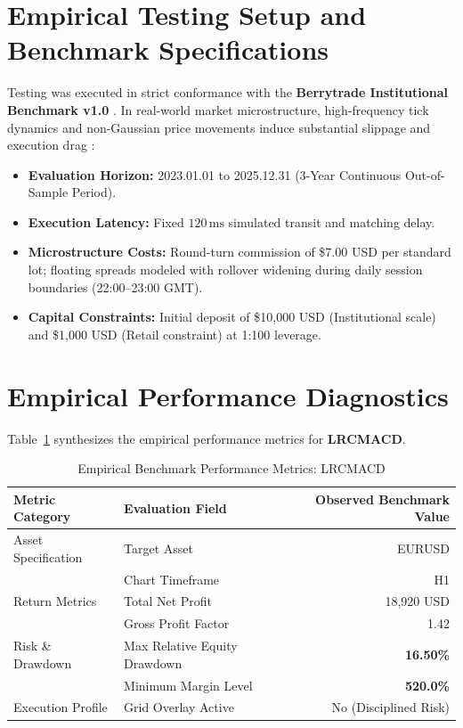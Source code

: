 \documentclass[11pt,a4paper]{article}
\begin{document}
\section{Empirical Testing Setup and Benchmark Specifications}
Testing was executed in strict conformance with the \textbf{Berrytrade Institutional Benchmark v1.0} \cite{artsu2026illusion}. In real-world market microstructure, high-frequency tick dynamics and non-Gaussian price movements induce substantial slippage and execution drag \cite{kyle1985continuous, amihud2002illiquidity, cont2001empirical, mandelbrot1963variation}:
\begin{itemize}
    \item \textbf{Evaluation Horizon:} 2023.01.01 to 2025.12.31 (3-Year Continuous Out-of-Sample Period).
    \item \textbf{Execution Latency:} Fixed $120\,\text{ms}$ simulated transit and matching delay.
    \item \textbf{Microstructure Costs:} Round-turn commission of \$7.00 USD per standard lot; floating spreads modeled with rollover widening during daily session boundaries (22:00--23:00 GMT).
    \item \textbf{Capital Constraints:} Initial deposit of \$10,000 USD (Institutional scale) and \$1,000 USD (Retail constraint) at 1:100 leverage.
\end{itemize}

\section{Empirical Performance Diagnostics}
Table~\ref{tab:metrics} synthesizes the empirical performance metrics for \textbf{LRCMACD}.

\begin{table}[H]
\centering
\caption{Empirical Benchmark Performance Metrics: LRCMACD}
\label{tab:metrics}
\begin{tabular}{llr}
\toprule
\textbf{Metric Category} & \textbf{Evaluation Field} & \textbf{Observed Benchmark Value} \\
\midrule
Asset Specification & Target Asset & EURUSD \\
& Chart Timeframe & H1 \\
Return Metrics & Total Net Profit & 18,920 USD \\
& Gross Profit Factor & 1.42 \\
Risk \& Drawdown & Max Relative Equity Drawdown & \textbf{16.50\%} \\
& Minimum Margin Level & \textbf{520.0\%} \\
Execution Profile & Grid Overlay Active & No (Disciplined Risk) \\
\bottomrule
\end{tabular}
\end{table}
\end{document}
